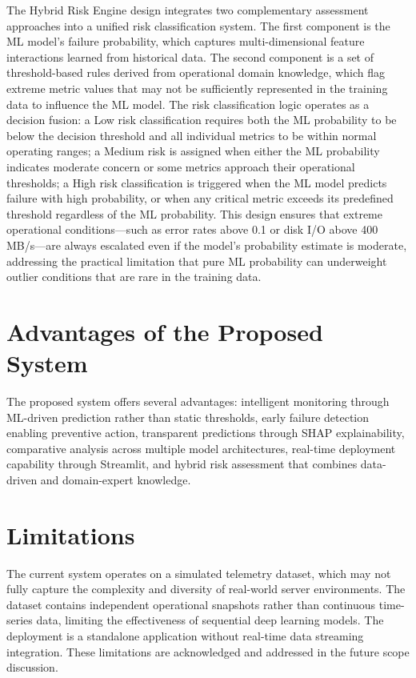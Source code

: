 \documentclass[12pt,letterpaper]{report}
\begin{document}
The Hybrid Risk Engine design integrates two complementary assessment approaches into a unified risk classification system. The first component is the ML model's failure probability, which captures multi-dimensional feature interactions learned from historical data. The second component is a set of threshold-based rules derived from operational domain knowledge, which flag extreme metric values that may not be sufficiently represented in the training data to influence the ML model. The risk classification logic operates as a decision fusion: a Low risk classification requires both the ML probability to be below the decision threshold and all individual metrics to be within normal operating ranges; a Medium risk is assigned when either the ML probability indicates moderate concern or some metrics approach their operational thresholds; a High risk classification is triggered when the ML model predicts failure with high probability, or when any critical metric exceeds its predefined threshold regardless of the ML probability. This design ensures that extreme operational conditions---such as error rates above 0.1 or disk I/O above 400 MB/s---are always escalated even if the model's probability estimate is moderate, addressing the practical limitation that pure ML probability can underweight outlier conditions that are rare in the training data.

\section{Advantages of the Proposed System}

The proposed system offers several advantages: intelligent monitoring through ML-driven prediction rather than static thresholds, early failure detection enabling preventive action, transparent predictions through SHAP explainability, comparative analysis across multiple model architectures, real-time deployment capability through Streamlit, and hybrid risk assessment that combines data-driven and domain-expert knowledge.

\section{Limitations}

The current system operates on a simulated telemetry dataset, which may not fully capture the complexity and diversity of real-world server environments. The dataset contains independent operational snapshots rather than continuous time-series data, limiting the effectiveness of sequential deep learning models. The deployment is a standalone application without real-time data streaming integration. These limitations are acknowledged and addressed in the future scope discussion.
\end{document}
